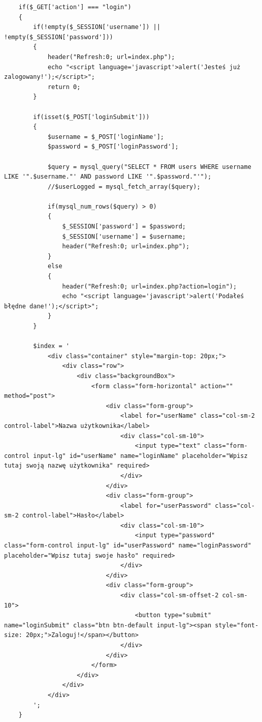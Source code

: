 \documentclass[a4paper]{article}
\begin{document}
	\begin{verbatim}
	if($_GET['action'] === "login")
    {
        if(!empty($_SESSION['username']) || !empty($_SESSION['password']))
        {
            header("Refresh:0; url=index.php");
            echo "<script language='javascript'>alert('Jesteś już zalogowany!');</script>";
            return 0;
        }
 
        if(isset($_POST['loginSubmit']))
        {
            $username = $_POST['loginName'];
            $password = $_POST['loginPassword'];
 
            $query = mysql_query("SELECT * FROM users WHERE username LIKE '".$username."' AND password LIKE '".$password."'");
            //$userLogged = mysql_fetch_array($query);
           
            if(mysql_num_rows($query) > 0)
            {
                $_SESSION['password'] = $password;
                $_SESSION['username'] = $username;
                header("Refresh:0; url=index.php");
            }
            else
            {
                header("Refresh:0; url=index.php?action=login");
                echo "<script language='javascript'>alert('Podałeś błędne dane!');</script>";
            }
        }
 
        $index = '
            <div class="container" style="margin-top: 20px;">
                <div class="row">
                    <div class="backgroundBox">
                        <form class="form-horizontal" action="" method="post">
                            <div class="form-group">
                                <label for="userName" class="col-sm-2 control-label">Nazwa użytkownika</label>
                                <div class="col-sm-10">
                                    <input type="text" class="form-control input-lg" id="userName" name="loginName" placeholder="Wpisz tutaj swoją nazwę użytkownika" required>
                                </div>
                            </div>
                            <div class="form-group">
                                <label for="userPassword" class="col-sm-2 control-label">Hasło</label>
                                <div class="col-sm-10">
                                    <input type="password" class="form-control input-lg" id="userPassword" name="loginPassword" placeholder="Wpisz tutaj swoje hasło" required>
                                </div>
                            </div>
                            <div class="form-group">
                                <div class="col-sm-offset-2 col-sm-10">
                                    <button type="submit" name="loginSubmit" class="btn btn-default input-lg"><span style="font-size: 20px;">Zaloguj!</span></button>
                                </div>
                            </div>
                        </form>
                    </div>
                </div>
            </div>
        ';
    }
	
	\end{verbatim}
	
\end{document}
